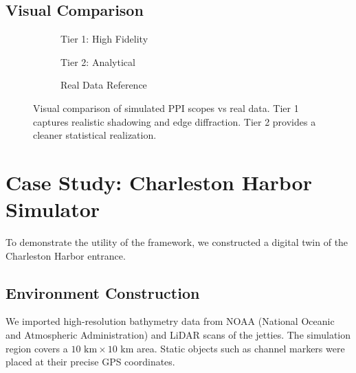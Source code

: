 \documentclass[conf]{new-aiaa}
\begin{document}
\subsection{Visual Comparison}
\begin{figure}[h]
    \centering
    \begin{subfigure}[b]{0.3\textwidth}
        \centering
        \caption{Tier 1: High Fidelity}
    \end{subfigure}
    \hfill
    \begin{subfigure}[b]{0.3\textwidth}
        \centering
        \caption{Tier 2: Analytical}
    \end{subfigure}
    \hfill
    \begin{subfigure}[b]{0.3\textwidth}
        \centering
        \caption{Real Data Reference}
    \end{subfigure}
    \caption{Visual comparison of simulated PPI scopes vs real data. Tier 1 captures realistic shadowing and edge diffraction. Tier 2 provides a cleaner statistical realization.}
    \label{fig:comparison}
\end{figure}

\section{Case Study: Charleston Harbor Simulator}
To demonstrate the utility of the framework, we constructed a digital twin of the Charleston Harbor entrance.
\subsection{Environment Construction}
We imported high-resolution bathymetry data from NOAA (National Oceanic and Atmospheric Administration) and LiDAR scans of the jetties. The simulation region covers a $10 \text{ km} \times 10 \text{ km}$ area.
Static objects such as channel markers were placed at their precise GPS coordinates.
\end{document}
